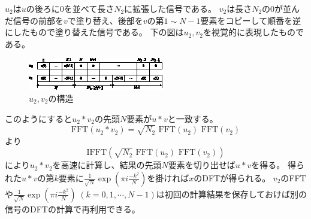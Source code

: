         $u_2$は$u$の後ろに$0$を並べて長さ$N_2$に拡張した信号である。
        $v_2$は長さ$N_2$の$0$が並んだ信号の前部を$v$で塗り替え、後部を$v$の第$1\sim N-1$要素をコピーして順番を逆にしたもので塗り替えた信号である。
        下の図は$u_2,v_2$を視覚的に表現したものである。
        \begin{figure}[H]
            \centering
            \includegraphics[keepaspectratio, scale=4]
            {parts/FourierAnalysis/imgs/FFT/arbitraryLengthFFT_to_powerOf2_FFT/u2,v2.eps}
            \caption{$u_2,v_2$の構造}
        \end{figure}
        このようにすると$u_2*v_2$の先頭$N$要素が$u*v$と一致する。
        \[ \text{FFT}(u_2*v_2) = \sqrt{N_2}\text{ FFT}(u_2) \text{ FFT}(v_2) \]
        より
        \[ \text{IFFT}(\sqrt{N_2}\text{ FFT}(u_2) \text{ FFT}(v_2)) \]
        により$u_2*v_2$を高速に計算し、結果の先頭$N$要素を切り出せば$u*v$を得る。
        得られた$u*v$の第$k$要素に$\frac{1}{\sqrt{N}} \exp \left(\pi i\frac{-k^2}{N}\right)$を掛ければ$x$のDFTが得られる。
        $v_2$のFFTや$\frac{1}{\sqrt{N}} \exp \left(\pi i\frac{-k^2}{N}\right) \;(k=0,1,\cdots,N-1)$は初回の計算結果を保存しておけば別の信号のDFTの計算で再利用できる。
